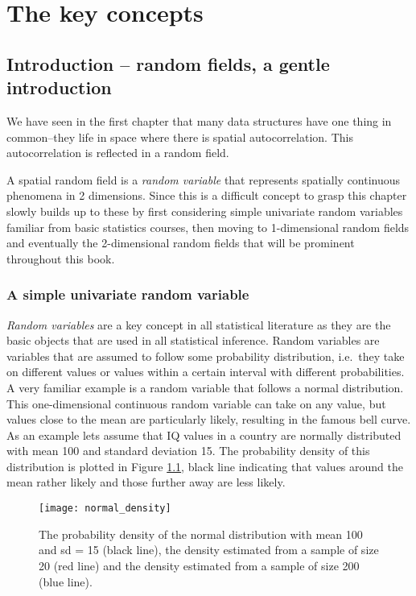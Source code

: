 \chapter{The key concepts}

\section{Introduction -- random fields, a gentle introduction}
We have seen in the first chapter that many data structures have one thing in common--they life in space where there is spatial autocorrelation. This autocorrelation is reflected in a random field.

A spatial random field is a \textit{random variable} that represents spatially continuous phenomena in 2 dimensions. Since this is a difficult concept to grasp this chapter slowly builds up to these by first considering simple univariate random variables familiar from basic statistics courses, then moving to 1-dimensional random fields and eventually the 2-dimensional random fields that will be prominent throughout this book.


\subsection{A simple univariate random variable}

\textit{Random variables} are a key concept in all statistical literature as they are the basic objects that are used in all statistical inference. Random variables are variables that are assumed to follow some probability distribution, i.e.\ they take on different values or values within a certain interval with different probabilities. 
A very familiar example is a random variable that follows a normal distribution. This one-dimensional continuous random variable can take on any value, but values close to the mean are particularly likely, resulting in the famous bell curve. As an example lets assume that IQ values in a country are normally distributed with mean 100 and standard deviation 15. The probability density of this distribution is plotted in Figure \ref{fig:ch2:normal}, black line indicating that values around the mean rather likely and those further away are less likely. 

\begin{figure}
\centering
\texttt{[image: normal\_density]}
\caption{\label{fig:ch2:normal} The probability density of the normal distribution with mean 100 and sd = 15 (black line), the density estimated from a sample of size 20 (red line) and the density estimated from a sample of size 200 (blue line). }
\end{figure}

